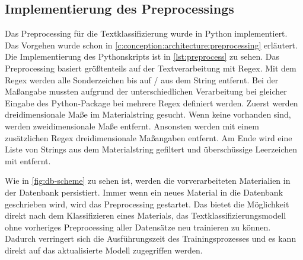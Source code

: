 \subsection{Implementierung des Preprocessings}
\label{c:implementation:preprocess}
Das Preprocessing für die Textklassifizierung wurde in Python implementiert.
Das Vorgehen wurde schon in \autoref{c:conception:architecture:preprocessing} erläutert. Die Implementierung des Pythonskripts ist in \autoref{lst:preprocess} zu sehen. Das Preprocessing basiert größtenteils auf der Textverarbeitung mit Regex. Mit dem Regex \code{[A-Za-z0-9üäöÜÄÖßóåéèÉÈÓ/]} werden alle Sonderzeichen bis auf  \glqq /\grqq{} aus dem String entfernt. Bei der Maßangabe mussten aufgrund der unterschiedlichen Verarbeitung bei gleicher Eingabe des Python-Package  bei   mehrere Regex definiert werden. Zuerst werden dreidimensionale Maße im Materialstring gesucht. Wenn keine vorhanden sind, werden zweidimensionale Maße entfernt. Ansonsten werden mit einem zusätzlichen Regex dreidimensionale Maßangaben entfernt. Am Ende wird eine Liste von Strings aus dem Materialstring gefiltert und überschüssige Leerzeichen mit  entfernt. 

Wie in \autoref{fig:db-scheme} zu sehen ist, werden die vorverarbeiteten Materialien in der Datenbank persistiert. Immer wenn ein neues Material in die Datenbank geschrieben wird, wird das Preprocessing gestartet. Das bietet die Möglichkeit direkt nach dem Klassifizieren eines Materials, das Textklassifizierungsmodell ohne vorheriges Preprocessing aller Datensätze neu trainieren zu können. Dadurch verringert sich die Ausführungszeit des Trainingsprozesses und es kann direkt auf das aktualisierte Modell zugegriffen werden.

